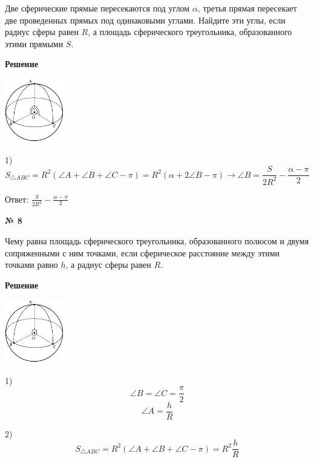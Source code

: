     Две сферические прямые пересекаются под углом $\alpha$, третья прямая пересекает две проведенных прямых
    под одинаковыми углами.
    Найдите эти углы, если радиус сферы равен $R$, а площадь сферического треугольника, образованного этими прямыми $S$.

    \textbf{Решение}\\

    \begin{center}
        \includegraphics[width=0.2\textwidth]{images/img4}\\
    \end{center}

    1)
    \[
        S_{\triangle ABC} = R^2(\angle A + \angle B + \angle C - \pi) =  R^2(\alpha + 2\angle B - \pi)\rightarrow
        \angle B = \frac{S}{2R^2} - \frac{\alpha- \pi}{2}
    \]

    Ответ: $\frac{S}{2R^2} - \frac{\alpha- \pi}{2} $

    \begin{center}
        \textbf{№ 8}
    \end{center}

    Чему равна площадь сферического треугольника, образованного полюсом и двумя сопряженными с ним точками,
    если сферическое расстояние между этими точками равно $h$, а радиус сферы равен $R$.

    \textbf{Решение}\\

    \begin{center}
        \includegraphics[width=0.2\textwidth]{images/img5}\\
    \end{center}

    1)
    \[
        \angle B = \angle C = \frac{\pi}{2}
    \]
    \[
        \angle A = \frac{h}{R}
    \]

    2) \[
           S_{\triangle ABC} = R^2(\angle A + \angle B + \angle C - \pi) = R^2\frac{h}{R}
    \]

